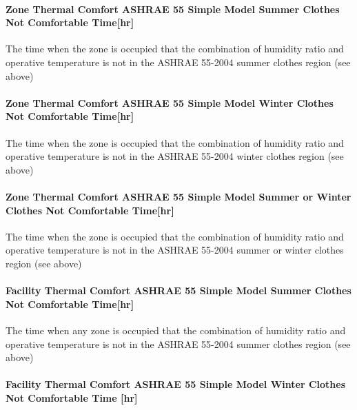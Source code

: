 \paragraph{Zone Thermal Comfort ASHRAE 55 Simple Model Summer Clothes Not Comfortable Time{[}hr{]}}\label{zone-thermal-comfort-ashrae-55-simple-model-summer-clothes-not-comfortable-timehr}

The time when the zone is occupied that the combination of humidity ratio and operative temperature is not in the ASHRAE 55-2004 summer clothes region (see above)

\paragraph{Zone Thermal Comfort ASHRAE 55 Simple Model Winter Clothes Not Comfortable Time{[}hr{]}}\label{zone-thermal-comfort-ashrae-55-simple-model-winter-clothes-not-comfortable-timehr}

The time when the zone is occupied that the combination of humidity ratio and operative temperature is not in the ASHRAE 55-2004 winter clothes region (see above)

\paragraph{Zone Thermal Comfort ASHRAE 55 Simple Model Summer or Winter Clothes Not Comfortable Time{[}hr{]}}\label{zone-thermal-comfort-ashrae-55-simple-model-summer-or-winter-clothes-not-comfortable-timehr}

The time when the zone is occupied that the combination of humidity ratio and operative temperature is not in the ASHRAE 55-2004 summer or winter clothes region (see above)

\paragraph{Facility Thermal Comfort ASHRAE 55 Simple Model Summer Clothes Not Comfortable Time{[}hr{]}}\label{facility-thermal-comfort-ashrae-55-simple-model-summer-clothes-not-comfortable-timehr}

The time when any zone is occupied that the combination of humidity ratio and operative temperature is not in the ASHRAE 55-2004 summer clothes region (see above)

\paragraph{Facility Thermal Comfort ASHRAE 55 Simple Model Winter Clothes Not Comfortable Time {[}hr{]}}\label{facility-thermal-comfort-ashrae-55-simple-model-winter-clothes-not-comfortable-time-hr}

